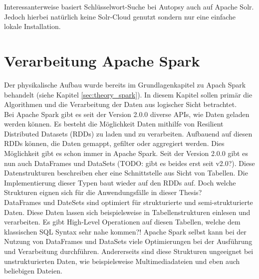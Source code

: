 \noindent
Interessanterweise basiert Schlüsselwort-Suche bei Autopsy auch auf Apache Solr. Jedoch hierbei natürlich keine Solr-Cloud genutzt sondern nur eine einfache lokale Installation.

\section{Verarbeitung Apache Spark\texttrademark}
Der physikalische Aufbau wurde bereits im Grundlagenkapitel zu Apach Spark behandelt (siehe Kapitel \ref{sec:theory_spark}). In diesem Kapitel sollen primär die Algorithmen und die Verarbeitung der Daten aus logischer Sicht betrachtet.\\ 

\noindent
Bei Apache Spark gibt es seit der Version 2.0.0 diverse APIs, wie Daten geladen werden können. Es besteht die Möglichkeit Daten mithilfe von Resilient Distributed Datasets (RDDs) zu laden und zu verarbeiten. Aufbauend auf diesen RDDs können, die Daten gemappt, gefilter oder aggregiert werden. Dies Möglichkeit gibt es schon immer in Apache Spark. Seit der Version 2.0.0 gibt es nun auch DataFrames und DataSets (TODO: gibt es beides erst seit v2.0?). Diese Datenstrukturen beschreiben eher eine Schnittstelle aus Sicht von Tabellen. Die Implementierung dieser Typen baut wieder auf den RDDs auf. Doch welche Strukturen eignen sich für die Anwendungsfälle in dieser Thesis? \\

\noindent
DataFrames und DateSets sind optimiert für strukturierte und semi-strukturierte Daten. Diese Daten lassen sich beispielsweise in Tabellenstrukturen einlesen und verarbeiten. Es gibt High-Level Operationen auf diesen Tabellen, welche dem klassischen SQL Syntax sehr nahe kommen?! Apache Spark selbst kann bei der Nutzung von DataFrames und DataSets viele Optimierungen bei der Ausführung und Verarbeitung durchführen. Andererseits sind diese Strukturen ungeeignet bei unstrukturierten Daten, wie beispielsweise Multimediadateien und eben auch beliebigen Dateien.\cite[S. 66 ff.]{data_processing_spark2}\\

